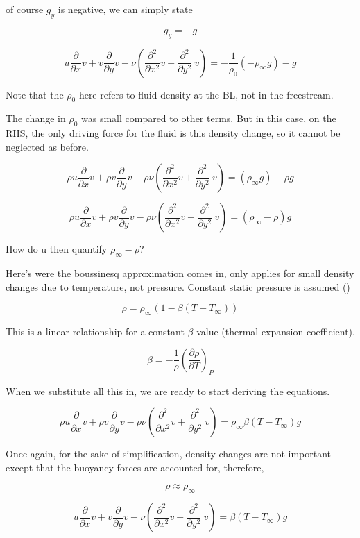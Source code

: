 \documentclass[11pt]{article}
\begin{document}
of course $g_y$ is negative, we can simply state

$$g_y = -g$$

$$ u \frac{\partial}{\partial x} v + v \frac{\partial}{\partial y} v  - \nu ( \frac{\partial^2}{\partial x^2} v + \frac{\partial^2}{\partial y^2} \ v ) = - \frac{1}{\rho_0} (-\rho_\infty g) -g$$

Note that the $\rho_0$ here refers to fluid density at the BL, not in the freestream.

The change in $\rho_0$ was small compared to other terms. But in this case, on the RHS, the only driving force for the fluid is this density change, so it cannot be neglected as before.

$$\rho u \frac{\partial}{\partial x} v + \rho v \frac{\partial}{\partial y} v  -\rho \nu ( \frac{\partial^2}{\partial x^2} v + \frac{\partial^2}{\partial y^2} \ v ) = (\rho_\infty g) - \rho g$$

$$\rho u \frac{\partial}{\partial x} v + \rho v \frac{\partial}{\partial y} v  -\rho \nu ( \frac{\partial^2}{\partial x^2} v + \frac{\partial^2}{\partial y^2} \ v ) = (\rho_\infty - \rho)  g$$

How do u then quantify $\rho_\infty - \rho$?

Here's were the boussinesq approximation comes in, only applies for small density changes due to temperature, not pressure. Constant static pressure is assumed (\cite{bejan2013convection})

$$\rho = \rho_\infty (1- \beta(T-T_\infty))$$

This is a linear relationship for a constant $\beta$ value (thermal expansion coefficient).

$$ \beta  = - \frac{1}{\rho} \left( \frac{\partial \rho}{\partial T} \right)_P$$

When we substitute all this in, we are ready to start deriving the equations.

$$\rho u \frac{\partial}{\partial x} v + \rho v \frac{\partial}{\partial y} v  -\rho \nu ( \frac{\partial^2}{\partial x^2} v + \frac{\partial^2}{\partial y^2} \ v ) = \rho_\infty \beta(T-T_\infty)  g$$

Once again, for the sake of simplification, density changes are not important except that the buoyancy forces are accounted for, therefore,

$$\rho \approx \rho_\infty$$

$$ u \frac{\partial}{\partial x} v +  v \frac{\partial}{\partial y} v  - \nu ( \frac{\partial^2}{\partial x^2} v + \frac{\partial^2}{\partial y^2} \ v ) =  \beta(T-T_\infty)  g$$
\end{document}
